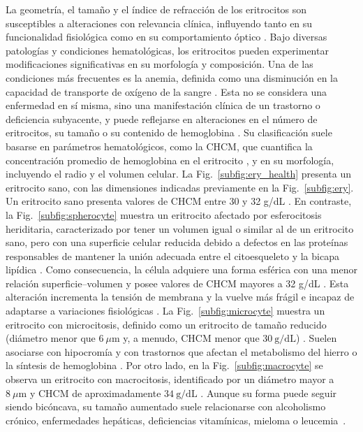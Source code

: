La geometría, el tamaño y el índice de refracción de los eritrocitos son susceptibles a alteraciones con relevancia clínica, influyendo tanto en su funcionalidad fisiológica como en su comportamiento óptico \cite{ergulComputationalStudyScattering2010}. Bajo diversas patologías y condiciones hematológicas, los eritrocitos pueden experimentar modificaciones significativas en su morfología y composición. Una de las condiciones más frecuentes es la anemia, definida como una disminución en la capacidad de transporte de oxígeno de la sangre  \cite{keohaneRodaksHematologyClinical2015}. Esta no se considera una enfermedad en sí misma, sino una manifestación clínica de un trastorno o deficiencia subyacente, y puede reflejarse en alteraciones en el número de eritrocitos, su tamaño o su contenido de hemoglobina \cite{keohaneRodaksHematologyClinical2015}. Su clasificación suele basarse en parámetros hematológicos, como la CHCM, que cuantifica la concentración promedio de hemoglobina en el eritrocito \cite{bosschaartLiteratureReviewNovel2014}, y en su morfología, incluyendo el radio y el volumen celular. La Fig.~\ref{subfig:ery_health} presenta un eritrocito sano, con las dimensiones indicadas previamente en la Fig.~\ref{subfig:ery}. Un eritrocito sano presenta valores de CHCM entre 30 y 32 g/dL \cite{saxenaClinicalEvaluationDifferent2018}. En contraste, la Fig.~\ref{subfig:spherocyte} muestra un eritrocito afectado por esferocitosis heriditaria, caracterizado por tener un volumen igual o similar al de un eritrocito sano, pero con una superficie celular reducida debido a defectos en las proteínas responsables de mantener la unión adecuada entre el citoesqueleto y la bicapa lipídica \cite{donatoEsferocitosisHereditariaRevision2015}. Como consecuencia, la célula adquiere una forma esférica con una menor relación superficie–volumen y posee valores de CHCM mayores a 32 g/dL \cite{saxenaClinicalEvaluationDifferent2018}. Esta alteración incrementa la tensión de membrana y la vuelve más frágil e incapaz de adaptarse a variaciones fisiológicas \cite{donatoEsferocitosisHereditariaRevision2015}. La Fig.~\ref{subfig:microcyte} muestra un eritrocito con microcitosis, definido como un eritrocito de tamaño reducido (diámetro menor que $ 6~\mu$m y, a menudo, CHCM menor que $ 30~\text{g/dL}$) \cite{saxenaClinicalEvaluationDifferent2018}. Suelen asociarse con hipocromía y con trastornos que afectan el metabolismo del hierro o la síntesis de hemoglobina \cite{ergulComputationalStudyScattering2010}. Por otro lado, en la Fig.~\ref{subfig:macrocyte} se observa un eritrocito con macrocitosis, identificado por un diámetro mayor a $ 8~\mu\text{m}$ y CHCM de aproximadamente $34~\text{g/dL}$ \cite{saxenaClinicalEvaluationDifferent2018}. Aunque su forma puede seguir siendo bicóncava, su tamaño aumentado suele relacionarse con alcoholismo crónico, enfermedades hepáticas, deficiencias vitamínicas, mieloma o leucemia~\cite{ergulComputationalStudyScattering2010}. 
  
